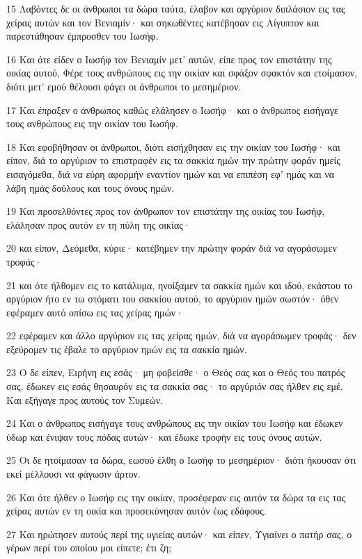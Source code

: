 \par 15 Λαβόντες δε οι άνθρωποι τα δώρα ταύτα, έλαβον και αργύριον διπλάσιον εις τας χείρας αυτών και τον Βενιαμίν· και σηκωθέντες κατέβησαν εις Αίγυπτον και παρεστάθησαν έμπροσθεν του Ιωσήφ.
\par 16 Και ότε είδεν ο Ιωσήφ τον Βενιαμίν μετ' αυτών, είπε προς τον επιστάτην της οικίας αυτού, Φέρε τους ανθρώπους εις την οικίαν και σφάξον σφακτόν και ετοίμασον, διότι μετ' εμού θέλουσι φάγει οι άνθρωποι το μεσημέριον.
\par 17 Και έπραξεν ο άνθρωπος καθώς ελάλησεν ο Ιωσήφ· και ο άνθρωπος εισήγαγε τους ανθρώπους εις την οικίαν του Ιωσήφ.
\par 18 Και εφοβήθησαν οι άνθρωποι, διότι εισήχθησαν εις την οικίαν του Ιωσήφ· και είπον, διά το αργύριον το επιστραφέν εις τα σακκία ημών την πρώτην φοράν ημείς εισαγόμεθα, διά να εύρη αφορμήν εναντίον ημών και να επιπέση εφ' ημάς και να λάβη ημάς δούλους και τους όνους ημών.
\par 19 Και προσελθόντες προς τον άνθρωπον τον επιστάτην της οικίας του Ιωσήφ, ελάλησαν προς αυτόν εν τη πύλη της οικίας·
\par 20 και είπον, Δεόμεθα, κύριε· κατέβημεν την πρώτην φοράν διά να αγοράσωμεν τροφάς·
\par 21 και ότε ήλθομεν εις το κατάλυμα, ηνοίξαμεν τα σακκία ημών και ιδού, εκάστου το αργύριον ήτο εν τω στόματι του σακκίου αυτού, το αργύριον ημών σωστόν· όθεν εφέραμεν αυτό οπίσω εις τας χείρας ημών·
\par 22 εφέραμεν και άλλο αργύριον εις τας χείρας ημών, διά να αγοράσωμεν τροφάς· δεν εξεύρομεν τις έβαλε το αργύριον ημών εις τα σακκία ημών.
\par 23 Ο δε είπεν, Ειρήνη εις εσάς· μη φοβείσθε· ο Θεός σας και ο Θεός του πατρός σας, έδωκεν εις εσάς θησαυρόν εις τα σακκία σας· το αργύριόν σας ήλθεν εις εμέ. Και εξήγαγε προς αυτούς τον Συμεών.
\par 24 Και ο άνθρωπος εισήγαγε τους ανθρώπους εις την οικίαν του Ιωσήφ και έδωκεν ύδωρ και ένιψαν τους πόδας αυτών· και έδωκε τροφήν εις τους όνους αυτών.
\par 25 Οι δε ητοίμασαν τα δώρα, εωσού έλθη ο Ιωσήφ το μεσημέριον· διότι ήκουσαν ότι εκεί μέλλουσι να φάγωσιν άρτον.
\par 26 Και ότε ήλθεν ο Ιωσήφ εις την οικίαν, προσέφεραν εις αυτόν τα δώρα τα εις τας χείρας αυτών εν τη οικία και προσεκύνησαν αυτόν έως εδάφους.
\par 27 Και ηρώτησεν αυτούς περί της υγιείας αυτών· και είπεν, Υγιαίνει ο πατήρ σας, ο γέρων περί του οποίου μοι είπετε; έτι ζη;
